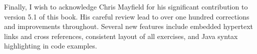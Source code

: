 Finally, I wish to acknowledge Chris Mayfield for his significant
contribution to version 5.1 of this book. His careful review
lead to over one hundred corrections and improvements throughout.
Several new features include embedded hypertext links and cross
references, consistent layout of all exercises, and Java syntax
highlighting in code examples.



\cleardoublepage
\setcounter{tocdepth}{1}
\tableofcontents

\mainmatter


